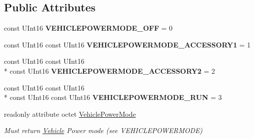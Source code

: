 \subsection*{Public Attributes}
\begin{DoxyCompactItemize}
\item 
\hypertarget{interfaceVehicle_1_1org_1_1automotive_1_1VehiclePowerMode_a55a502bf3b83c3c59ea9f816f38164f4}{const U\-Int16 {\bfseries V\-E\-H\-I\-C\-L\-E\-P\-O\-W\-E\-R\-M\-O\-D\-E\-\_\-\-O\-F\-F} = 0}\label{interfaceVehicle_1_1org_1_1automotive_1_1VehiclePowerMode_a55a502bf3b83c3c59ea9f816f38164f4}

\item 
\hypertarget{interfaceVehicle_1_1org_1_1automotive_1_1VehiclePowerMode_ab2ff0efa223097699fd4078ba2b1d6f4}{const U\-Int16 const U\-Int16 {\bfseries V\-E\-H\-I\-C\-L\-E\-P\-O\-W\-E\-R\-M\-O\-D\-E\-\_\-\-A\-C\-C\-E\-S\-S\-O\-R\-Y1} = 1}\label{interfaceVehicle_1_1org_1_1automotive_1_1VehiclePowerMode_ab2ff0efa223097699fd4078ba2b1d6f4}

\item 
\hypertarget{interfaceVehicle_1_1org_1_1automotive_1_1VehiclePowerMode_a9c4185de150bd3a6d3d7f46f92eabade}{const U\-Int16 const U\-Int16 \\*
const U\-Int16 {\bfseries V\-E\-H\-I\-C\-L\-E\-P\-O\-W\-E\-R\-M\-O\-D\-E\-\_\-\-A\-C\-C\-E\-S\-S\-O\-R\-Y2} = 2}\label{interfaceVehicle_1_1org_1_1automotive_1_1VehiclePowerMode_a9c4185de150bd3a6d3d7f46f92eabade}

\item 
\hypertarget{interfaceVehicle_1_1org_1_1automotive_1_1VehiclePowerMode_afe037f7282d3dee83fca0cd7791d00fb}{const U\-Int16 const U\-Int16 \\*
const U\-Int16 const U\-Int16 {\bfseries V\-E\-H\-I\-C\-L\-E\-P\-O\-W\-E\-R\-M\-O\-D\-E\-\_\-\-R\-U\-N} = 3}\label{interfaceVehicle_1_1org_1_1automotive_1_1VehiclePowerMode_afe037f7282d3dee83fca0cd7791d00fb}

\item 
readonly attribute octet \hyperlink{interfaceVehicle_1_1org_1_1automotive_1_1VehiclePowerMode_a3fbcbda3857e093c4e0970f6b2b3d1c3}{Vehicle\-Power\-Mode}
\begin{DoxyCompactList}\small\item\em Must return \hyperlink{namespaceVehicle}{Vehicle} Power mode (see V\-E\-H\-I\-C\-L\-E\-P\-O\-W\-E\-R\-M\-O\-D\-E) \end{DoxyCompactList}\end{DoxyCompactItemize}


